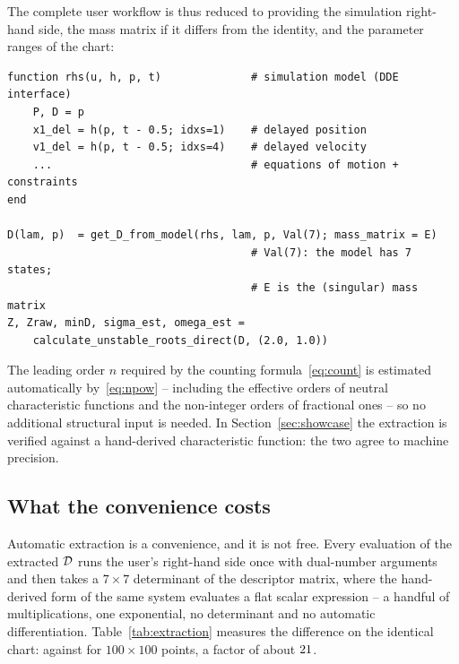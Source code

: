 The complete user workflow is thus reduced to providing the simulation
right-hand side, the mass matrix if it differs from the identity, and the
parameter ranges of the chart:
\begin{verbatim}
function rhs(u, h, p, t)              # simulation model (DDE interface)
    P, D = p
    x1_del = h(p, t - 0.5; idxs=1)    # delayed position
    v1_del = h(p, t - 0.5; idxs=4)    # delayed velocity
    ...                               # equations of motion + constraints
end

D(lam, p)  = get_D_from_model(rhs, lam, p, Val(7); mass_matrix = E)
                                      # Val(7): the model has 7 states;
                                      # E is the (singular) mass matrix
Z, Zraw, minD, sigma_est, omega_est =
    calculate_unstable_roots_direct(D, (2.0, 1.0))
\end{verbatim}
The leading order $n$ required by the counting
formula~\eqref{eq:count} is estimated automatically
by~\eqref{eq:npow} -- including the effective orders of neutral
characteristic functions and the non-integer orders of fractional ones --
so no additional structural input is needed. In
Section~\ref{sec:showcase} the extraction is verified against a hand-derived
characteristic function: the two agree to machine precision.

\subsection{What the convenience costs}\label{sec:extraction-cost}

\begin{table}[tb]
  \centering
  \caption{The price of never deriving $\Dfun$ by hand. Both forms are the
  \emph{same} function -- they agree to machine precision and every one of the
  $10^4$ counts is identical -- and differ only in how each evaluation is
  obtained. Same system, same chart, same settings
  ($\wmax=10^{4}$, default tolerance).}\label{tab:extraction}
\end{table}

Automatic extraction is a convenience, and it is not free. Every evaluation of
the extracted $\Dfun$ runs the user's right-hand side once with dual-number
arguments and then takes a $7\times7$ determinant of the descriptor matrix,
where the hand-derived form of the same system evaluates a flat scalar
expression -- a handful of multiplications, one exponential, no determinant
and no automatic differentiation. Table~\ref{tab:extraction} measures the
difference on the identical chart: \ExtractHandT{} against \ExtractAutoT{}
for $100\times100$ points, a factor of about $21$.

